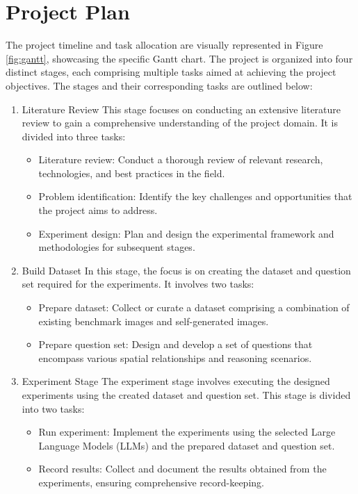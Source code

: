 \documentclass[journal,10pt]{IEEEtran}
\begin{document}
\section{Project Plan}
The project timeline and task allocation are visually represented in Figure \ref{fig:gantt}, showcasing the specific Gantt chart. The project is organized into four distinct stages, each comprising multiple tasks aimed at achieving the project objectives. The stages and their corresponding tasks are outlined below:
\begin{enumerate}
    \item Literature Review
    \subitem This stage focuses on conducting an extensive literature review to gain a comprehensive understanding of the project domain. It is divided into three tasks:
    \begin{itemize}
        \item Literature review: Conduct a thorough review of relevant research, technologies, and best practices in the field.
        \item Problem identification: Identify the key challenges and opportunities that the project aims to address.
        \item Experiment design: Plan and design the experimental framework and methodologies for subsequent stages.
    \end{itemize}
    \item Build Dataset
    \subitem In this stage, the focus is on creating the dataset and question set required for the experiments. It involves two tasks:
    \begin{itemize}
        \item Prepare dataset: Collect or curate a dataset comprising a combination of existing benchmark images and self-generated images.
        \item Prepare question set: Design and develop a set of questions that encompass various spatial relationships and reasoning scenarios.
    \end{itemize}
    \item Experiment Stage
    \subitem The experiment stage involves executing the designed experiments using the created dataset and question set. This stage is divided into two tasks:
    \begin{itemize}
        \item Run experiment: Implement the experiments using the selected Large Language Models (LLMs) and the prepared dataset and question set.
        \item Record results: Collect and document the results obtained from the experiments, ensuring comprehensive record-keeping.

\end{itemize}
\end{enumerate}
\end{document}
